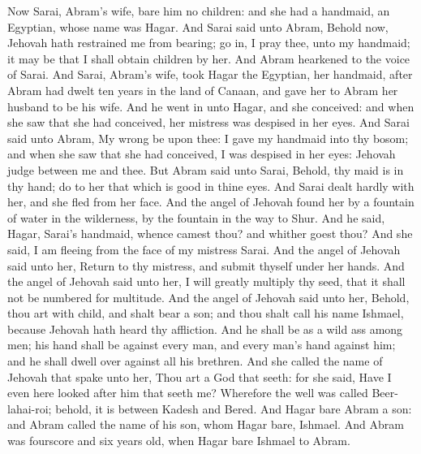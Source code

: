 Now Sarai, Abram’s wife, bare him no children: and she had a handmaid, an Egyptian, whose name was Hagar. And Sarai said unto Abram, Behold now, Jehovah hath restrained me from bearing; go in, I pray thee, unto my handmaid; it may be that I shall obtain children by her. And Abram hearkened to the voice of Sarai. And Sarai, Abram’s wife, took Hagar the Egyptian, her handmaid, after Abram had dwelt ten years in the land of Canaan, and gave her to Abram her husband to be his wife. And he went in unto Hagar, and she conceived: and when she saw that she had conceived, her mistress was despised in her eyes. And Sarai said unto Abram, My wrong be upon thee: I gave my handmaid into thy bosom; and when she saw that she had conceived, I was despised in her eyes: Jehovah judge between me and thee. But Abram said unto Sarai, Behold, thy maid is in thy hand; do to her that which is good in thine eyes. And Sarai dealt hardly with her, and she fled from her face.  And the angel of Jehovah found her by a fountain of water in the wilderness, by the fountain in the way to Shur. And he said, Hagar, Sarai’s handmaid, whence camest thou? and whither goest thou? And she said, I am fleeing from the face of my mistress Sarai. And the angel of Jehovah said unto her, Return to thy mistress, and submit thyself under her hands. And the angel of Jehovah said unto her, I will greatly multiply thy seed, that it shall not be numbered for multitude. And the angel of Jehovah said unto her, Behold, thou art with child, and shalt bear a son; and thou shalt call his name Ishmael, because Jehovah hath heard thy affliction. And he shall be as a wild ass among men; his hand shall be against every man, and every man’s hand against him; and he shall dwell over against all his brethren. And she called the name of Jehovah that spake unto her, Thou art a God that seeth: for she said, Have I even here looked after him that seeth me? Wherefore the well was called Beer-lahai-roi; behold, it is between Kadesh and Bered.  And Hagar bare Abram a son: and Abram called the name of his son, whom Hagar bare, Ishmael. And Abram was fourscore and six years old, when Hagar bare Ishmael to Abram. 

